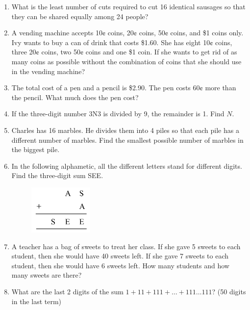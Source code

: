 \documentclass[11pt]{scrartcl}
\begin{document}
\begin{enumerate}
    \item What is the least number of cuts required to cut 16 identical sausages so that they can be shared equally among 24 people?
    
    \item A vending machine accepts 10¢ coins, 20¢ coins, 50¢ coins, and \$1 coins only. Ivy wants to buy a can of drink that costs \$1.60. She has eight 10¢ coins, three 20¢ coins, two 50¢ coins and one \$1 coin. If she wants to get rid of as many coins as possible without the combination of coins that she should use in the vending machine?

       \item The total cost of a pen and a pencil is \$2.90. The pen costs 60¢ more than the pencil. What much does the pen cost?
    
    \item If the three-digit number 3N3 is divided by 9, the remainder is 1. Find \( N \).
    
    \item Charles has 16 marbles. He divides them into 4 piles so that each pile has a different number of marbles. Find the smallest possible number of marbles in the biggest pile.

    \item In the following alphametic, all the different letters stand for different digits. Find the three-digit sum SEE.
    \begin{figure}[h]
        \centering
        \includegraphics[width=0.3\textwidth]{StarGen/G7-8 and G3-4/see.png}
    \end{figure}
    
    \item A teacher has a bag of sweets to treat her class. If she gave 5 sweets to each student, then she would have 40 sweets left. If she gave 7 sweets to each student, then she would have 6 sweets left. How many students and how many sweets are there?
    
    \item What are the last 2 digits of the sum \( 1 + 11 + 111 + \ldots + 111\ldots111 \)? (50 digits in the last term)
    

\end{enumerate}
\end{document}
